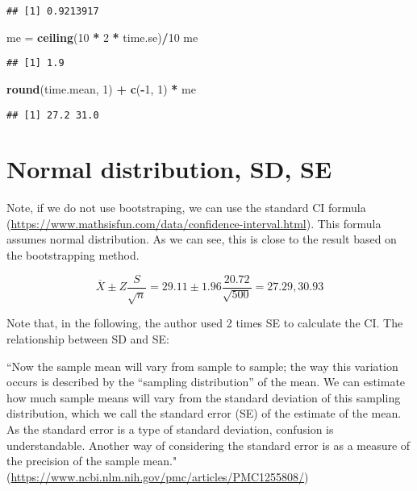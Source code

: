 \documentclass[]{book}
\newenvironment{Shaded}{\begin{snugshade}}{\end{snugshade}}
\newcommand{\DecValTok}[1]{\textcolor[rgb]{0.00,0.00,0.81}{#1}}
\newcommand{\KeywordTok}[1]{\textcolor[rgb]{0.13,0.29,0.53}{\textbf{#1}}}
\newcommand{\NormalTok}[1]{#1}
\newcommand{\OperatorTok}[1]{\textcolor[rgb]{0.81,0.36,0.00}{\textbf{#1}}}
\newcommand{\StringTok}[1]{\textcolor[rgb]{0.31,0.60,0.02}{#1}}
\begin{document}
\begin{verbatim}
## [1] 0.9213917
\end{verbatim}

\begin{Shaded}
\begin{Highlighting}[]
\NormalTok{me =}\StringTok{ }\KeywordTok{ceiling}\NormalTok{(}\DecValTok{10} \OperatorTok{*}\StringTok{ }\DecValTok{2} \OperatorTok{*}\StringTok{ }\NormalTok{time.se)}\OperatorTok{/}\DecValTok{10}
\NormalTok{me}
\end{Highlighting}
\end{Shaded}

\begin{verbatim}
## [1] 1.9
\end{verbatim}

\begin{Shaded}
\begin{Highlighting}[]
\KeywordTok{round}\NormalTok{(time.mean, }\DecValTok{1}\NormalTok{) }\OperatorTok{+}\StringTok{ }\KeywordTok{c}\NormalTok{(}\OperatorTok{-}\DecValTok{1}\NormalTok{, }\DecValTok{1}\NormalTok{) }\OperatorTok{*}\StringTok{ }\NormalTok{me}
\end{Highlighting}
\end{Shaded}

\begin{verbatim}
## [1] 27.2 31.0
\end{verbatim}

\hypertarget{normal-distribution-sd-se}{%
\section{Normal distribution, SD, SE}\label{normal-distribution-sd-se}}

Note, if we do not use bootstraping, we can use the standard CI formula (\url{https://www.mathsisfun.com/data/confidence-interval.html}). This formula assumes normal distribution. As we can see, this is close to the result based on the bootstrapping method.

\[\overline{X} \pm Z \frac{S}{\sqrt{n}}=29.11 \pm 1.96 \frac{20.72}{\sqrt{500}}=27.29, 30.93\]

Note that, in the following, the author used 2 times SE to calculate the CI. The relationship between SD and SE:

``Now the sample mean will vary from sample to sample; the way this variation occurs is described by the ``sampling distribution'' of the mean. We can estimate how much sample means will vary from the standard deviation of this sampling distribution, which we call the standard error (SE) of the estimate of the mean. As the standard error is a type of standard deviation, confusion is understandable. Another way of considering the standard error is as a measure of the precision of the sample mean." (\url{https://www.ncbi.nlm.nih.gov/pmc/articles/PMC1255808/})
\end{document}
